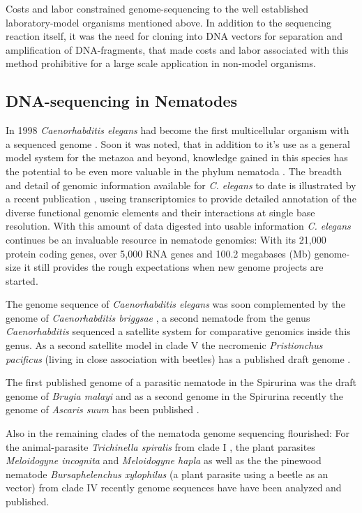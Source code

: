 Costs and labor constrained genome-sequencing to the well established
laboratory-model organisms mentioned above. In addition to the
sequencing reaction itself, it was the need for cloning into DNA
vectors for separation and amplification of DNA-fragments, that made
costs and labor associated with this method prohibitive for a large
scale application in non-model organisms.

\subsection{DNA-sequencing in Nematodes}
\label{sec:dna-sequ-nemat}

In 1998 \textit{Caenorhabditis elegans} had become the first
multicellular organism with a sequenced genome
\cite{pmid9851916}. Soon it was noted, that in addition to it's use as
a general model system for the metazoa and beyond, knowledge gained in
this species has the potential to be even more valuable in the phylum
nematoda \cite{blaxter_caenorhabditis_1998}. The breadth and detail of
genomic information available for \textit{C. elegans} to date is
illustrated by a recent publication \cite{pmid21177976}, useing
transcriptomics to provide detailed annotation of the diverse
functional genomic elements and their interactions at single base
resolution. With this amount of data digested into usable information
\textit{C. elegans} continues be an invaluable resource in nematode
genomics: With its 21,000 protein coding genes, over 5,000 RNA genes
and 100.2 megabases (Mb) genome-size it still provides the rough
expectations when new genome projects are started.

The genome sequence of \textit{Caenorhabditis elegans} was soon
complemented by the genome of \textit{Caenorhabditis briggsae}
\cite{stein_genome_2003}, a second nematode from the genus
\textit{Caenorhabditis} sequenced a satellite system for comparative
genomics inside this genus. As a second satellite model in clade V
the necromenic \textit{Pristionchus pacificus} (living in close
association with beetles) has a published draft genome
\cite{pmid18806794}. 

The first published genome of a parasitic nematode in the Spirurina
was the draft genome of \textit{Brugia malayi}
\cite{ghedin_draft_2007} and as a second genome in the Spirurina
recently the genome of \textit{Ascaris suum} has been published
\cite{pmid22031327}.

Also in the remaining clades of the nematoda genome sequencing
flourished: For the animal-parasite \textit{Trichinella spiralis} from
clade I \cite{pmid21336279}, the plant parasites \textit{Meloidogyne
  incognita} \cite{pmid18660804} and \textit{Meloidogyne hapla}
\cite{pmid18809916} as well as the the pinewood nematode
\textit{Bursaphelenchus xylophilus} \cite{pmid21909270} (a plant
parasite using a beetle as an vector) from clade IV recently genome
sequences have have been analyzed and published.

